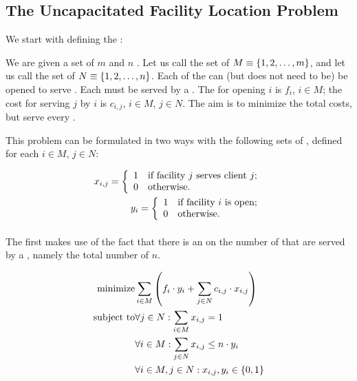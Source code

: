 \subsection{The Uncapacitated Facility Location Problem}

We start with defining the :

\begin{definition}
We are given a set of $m$  and $n$ . Let us call the set of  $M\equiv\left\{ 1,2,\ldots,m \right\}$, and let us call the set of  $N\equiv\left\{ 1,2,\ldots,n \right\}$. Each of the  can (but does not need to be) be opened to serve . Each  must be served by a . The  for opening  $i$ is $f_i$, $i\in M$; the cost for serving  $j$ by  $i$ is $c_{i,j}$, $i\in M$, $j\in N$. The aim is to minimize the total costs, but serve every .
\end{definition}

This problem can be formulated in two ways with the following sets of , defined for each $i\in M$, $j\in N$:

\begin{eqnarray}
x_{i,j}=\left\{\begin{array}{ll} 1&\mbox{if facility $j$ serves client $j$;}\\0&\mbox{otherwise.} \end{array}\right.\\
y_i=\left\{\begin{array}{ll} 1&\mbox{if facility $i$ is open;}\\0&\mbox{otherwise.} \end{array}\right.
\end{eqnarray}

\paragraph{}
The first  makes use of the fact that there is an  on the number of  that are served by a , namely the total number of  $n$.

\begin{eqnarray}
\mbox{minimize}&\sumdomain[i]{M}{\brak{f_i\cdot y_i+\sumdomain[j]{N}{c_{i,j}\cdot x_{i,j}}}}\eqnlab{ufl-ma}\\
\mbox{subject to}&\forall j\in N:\sumdomain[i]{M}{x_{i,j}}=1\eqnlab{ufl-ca1}\\
&\forall i\in M:\sumdomain[j]{N}{x_{i,j}}\leq n\cdot y_i\eqnlab{ufl-ca2}\\
&\forall i\in M,j\in N:x_{i,j},y_i\in\accl{0,1}\eqnlab{ufl-ca3}
\end{eqnarray}

